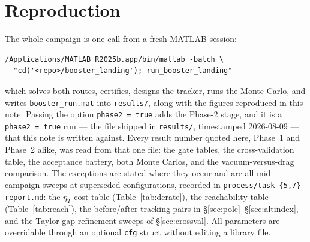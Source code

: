 \documentclass[11pt]{article}
\newcommand{\etaT}{\eta_T}
\begin{document}
\section*{Reproduction}

The whole campaign is one call from a fresh MATLAB session:

{\footnotesize
\begin{verbatim}
/Applications/MATLAB_R2025b.app/bin/matlab -batch \
  "cd('<repo>/booster_landing'); run_booster_landing"
\end{verbatim}
}

\begin{sloppypar}
\noindent
which solves both routes, certifies, designs the tracker, runs the
Monte Carlo, and writes \texttt{booster\_run.mat} into \texttt{results/},
along with the figures
reproduced in this note. Passing the option \texttt{phase2 = true} adds the
Phase-2 stage, and it is a \texttt{phase2 = true} run --- the file shipped
in \texttt{results/}, timestamped 2026-08-09 --- that this note is written
against. Every result number quoted here, Phase~1 and Phase~2 alike, was
read from that one file: the gate tables, the cross-validation table, the
acceptance battery, both Monte Carlos, and the vacuum-versus-drag
comparison. The exceptions are stated where they occur and are all
mid-campaign sweeps at superseded configurations, recorded in
\texttt{process/task-\{5,7\}-report.md}: the $\etaT$ cost table
(Table~\ref{tab:derate}), the reachability table (Table~\ref{tab:reach}),
the before/after tracking pairs in \S\ref{sec:pole}--\S\ref{sec:altindex},
and the Taylor-gap refinement sweeps of \S\ref{sec:crossval}. All
parameters are overridable through an optional \texttt{cfg} struct without
editing a library file.
\end{sloppypar}
\end{document}
